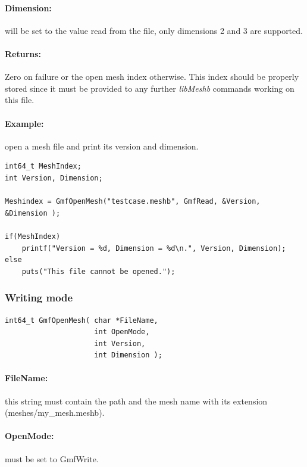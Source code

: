 \documentclass[a4paper,12pt]{article}
\begin{document}
\paragraph{Dimension:}
will be set to the value read from the file, only dimensions 2 and 3 are supported.

\paragraph{Returns:}
Zero on failure or the open mesh index otherwise. This index should be properly stored since it must be provided to any further \emph{libMeshb} commands working on this file.

\paragraph{Example:} open a mesh file and print its version and dimension.

\begin{tt}
\begin{verbatim}
int64_t MeshIndex;
int Version, Dimension;

Meshindex = GmfOpenMesh("testcase.meshb", GmfRead, &Version, &Dimension );

if(MeshIndex)
    printf("Version = %d, Dimension = %d\n.", Version, Dimension);
else
    puts("This file cannot be opened.");
\end{verbatim}
\end{tt}
\normalfont


\subsubsection{Writing mode}
\begin{tt}
\begin{verbatim}
int64_t GmfOpenMesh( char *FileName,
                     int OpenMode,
                     int Version,
                     int Dimension );
\end{verbatim}
\end{tt}
\normalfont

\paragraph{FileName:}
this string must contain the path and the mesh name with its extension (meshes/my\_mesh.meshb).

\paragraph{OpenMode:}
must be set to GmfWrite.
\end{document}
